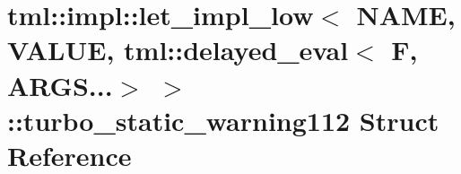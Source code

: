 \hypertarget{structtml_1_1impl_1_1let__impl__low_3_01NAME_00_01VALUE_00_01tml_1_1delayed__eval_3_01F_00_01ARGfa1b3cb6d23c24dca45f4e96234fdcd1}{\section{tml\+:\+:impl\+:\+:let\+\_\+impl\+\_\+low$<$ N\+A\+M\+E, V\+A\+L\+U\+E, tml\+:\+:delayed\+\_\+eval$<$ F, A\+R\+G\+S...$>$ $>$\+:\+:turbo\+\_\+static\+\_\+warning112 Struct Reference}
\label{structtml_1_1impl_1_1let__impl__low_3_01NAME_00_01VALUE_00_01tml_1_1delayed__eval_3_01F_00_01ARGfa1b3cb6d23c24dca45f4e96234fdcd1}
}
